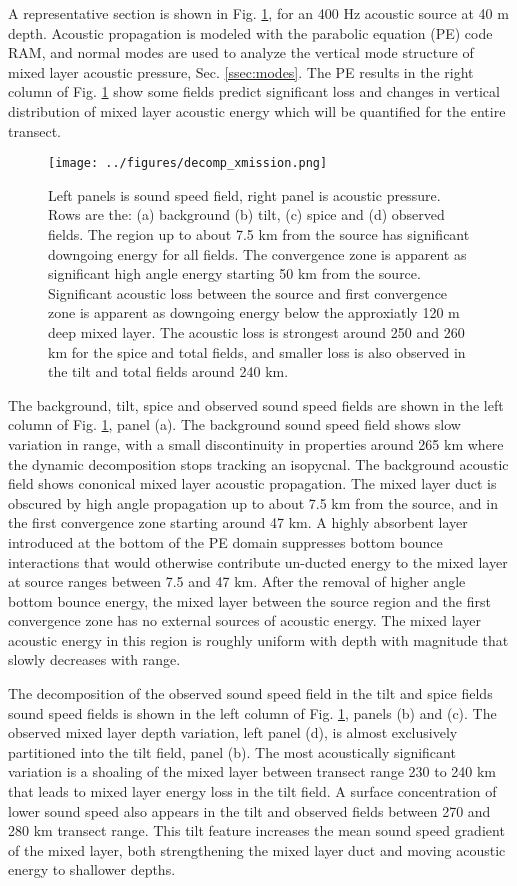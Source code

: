 \documentclass[preprint,NumberedRefs]{JASA}
\begin{document}
A representative section is shown in Fig. \ref{fig:decomp_x}, for an 400 Hz acoustic source at 40 m depth. Acoustic propagation is modeled with the parabolic equation (PE) code RAM, and normal modes are used to analyze the vertical mode structure of mixed layer acoustic pressure, Sec. \ref{ssec:modes}. The PE results in the right column of Fig. \ref{fig:decomp_x} show some fields predict significant loss and changes in vertical distribution of mixed layer acoustic energy which will be quantified for the entire transect.

\begin{figure}
\texttt{[image: ../figures/decomp\_xmission.png]}
    \caption{\label{fig:decomp_x}{Left panels is sound speed field, right panel is acoustic pressure. Rows are the: (a) background (b) tilt, (c) spice and (d) observed fields. The region up to about 7.5 km from the source has significant downgoing energy for all fields. The convergence zone is apparent as significant high angle energy starting 50 km from the source. Significant acoustic loss between the source and first convergence zone is apparent as downgoing energy below the approxiatly 120 m deep mixed layer. The acoustic loss is strongest around 250 and 260 km for the spice and total fields, and smaller loss is also observed in the tilt and total fields around 240 km.}}
\end{figure}

The background, tilt, spice and observed sound speed fields are shown in the left column of Fig. \ref{fig:decomp_x}, panel (a). The background sound speed field shows slow variation in range, with a small discontinuity in properties around 265 km where the dynamic decomposition stops tracking an isopycnal. The background acoustic field shows cononical mixed layer acoustic propagation. The mixed layer duct is obscured by high angle propagation up to about 7.5 km from the source, and in the first convergence zone starting around 47 km. A highly absorbent layer introduced at the bottom of the PE domain suppresses bottom bounce interactions that would otherwise contribute un-ducted energy to the mixed layer at source ranges between 7.5 and 47 km. After the removal of higher angle bottom bounce energy, the mixed layer between the source region and the first convergence zone has no external sources of acoustic energy. The mixed layer acoustic energy in this region is roughly uniform with depth with magnitude that slowly decreases with range.

The decomposition of the observed sound speed field in the tilt and spice fields sound speed fields is shown in the left column of Fig. \ref{fig:decomp_x}, panels (b) and (c). The observed mixed layer depth variation, left panel (d), is almost exclusively partitioned into the tilt field, panel (b). The most acoustically significant variation is a shoaling of the mixed layer between transect range 230 to 240 km that leads to mixed layer energy loss in the tilt field. A surface concentration of lower sound speed also appears in the tilt and observed fields between 270 and 280 km transect range. This tilt feature increases the mean sound speed gradient of the mixed layer, both strengthening the mixed layer duct and moving acoustic energy to shallower depths.
\end{document}
